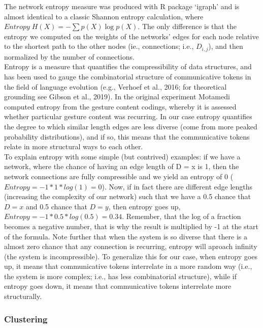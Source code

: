\documentclass[
  man, noextraspace,floatsintext]{apa6}
\begin{document}
The network entropy measure was produced with R package `igraph' and is almost identical to a classic Shannon entropy calculation, where \(Entropy\; H(X) = -\sum p(X)\log p(X)\). The only difference is that the entropy we computed on the weights of the networks' edges for each node relative to the shortest path to the other nodes (ie., connections; i.e., \(D_{i,j}\)), and then normalized by the number of connections.\\
Entropy is a measure that quantifies the compressibility of data structures, and has been used to gauge the combinatorial structure of communicative tokens in the field of language evolution (e.g., Verhoef et al., 2016; for theoretical grounding see Gibson et al., 2019). In the original experiment Motamedi computed entropy from the gesture content codings, whereby it is assessed whether particular gesture content was recurring. In our case entropy quantifies the degree to which similar length edges are less diverse (come from more peaked probability distributions), and if so, this means that the communicative tokens relate in more structural ways to each other.\\
To explain entropy with some simple (but contrived) examples: if we have a network, where the chance of having an edge length of D = x is 1, then the network connections are fully compressible and we yield an entropy of 0 (\(Entropy = -1 * 1 * log(1) = 0\)). Now, if in fact there are different edge lengths (increasing the complexity of our network) such that we have a 0.5 chance that \(D = x\) and 0.5 chance that \(D = y\), then entropy goes up, \(Entropy = -1 * 0.5 * log(0.5) = 0.34\). Remember, that the log of a fraction becomes a negative number, that is why the result is multiplied by -1 at the start of the formula. Note further that when the system is so diverse that there is a almost zero chance that any connection is recurring, entropy will aproach infinity (the system is incompressible). To generalize this for our case, when entropy goes up, it means that communicative tokens interrelate in a more random way (i.e., the system is more complex; i.e., has less combinatorial structure), while if entropy goes down, it means that communicative tokens interrelate more structurally.

\hypertarget{clustering}{%
\subsubsection{Clustering}\label{clustering}}
\end{document}
